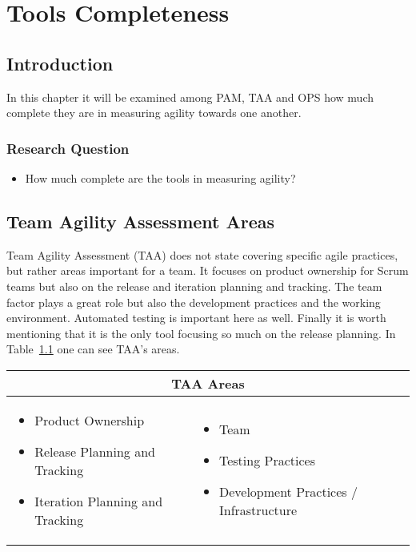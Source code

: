 \chapter{Tools Completeness}
\label{ch:tools_completness}

\section{Introduction}
In this chapter it will be examined among PAM, TAA and OPS how much complete they are in measuring agility towards one another.

\subsection{Research Question}
\begin{itemize}
	\item How much complete are the tools in measuring agility?
\end{itemize}

\section{Team Agility Assessment Areas}
Team Agility Assessment (TAA) does not state covering specific agile practices, but rather areas important for a team. It focuses on product ownership for Scrum teams but also on the release and iteration planning and tracking. The team factor plays a great role but also the development practices and the working environment. Automated testing is important here as well. Finally it is worth mentioning that it is the only tool focusing so much on the release planning. In Table~\ref{table:taa_practices} one can see TAA's areas.

\begin{table}
  \begin{tabular}{| p{5cm} p{5cm} |}
    \hline
    \multicolumn{2}{|c|}{\textbf{TAA Areas}}  \\ \hline
     \begin{itemize} \item Product Ownership \item Release Planning and Tracking \item Iteration Planning and Tracking \end{itemize} &
     \begin{itemize}  \item Team \item Testing Practices \item Development Practices / Infrastructure \end{itemize}  \\ \hline
  \end{tabular}
  \label{table:taa_practices}
\end{table}

